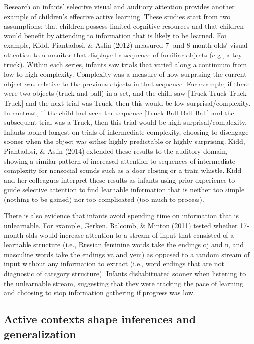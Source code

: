 \documentclass[oneside]{report}
\begin{document}
Research on infants' selective visual and auditory attention provides
another example of children's effective active learning. These studies
start from two assumptions: that children possess limited cognitive
resources and that children would benefit by attending to information
that is likely to be learned. For example, Kidd, Piantadosi, \& Aslin
(2012) measured 7- and 8-month-olds' visual attention to a monitor that
displayed a sequence of familiar objects (e.g., a toy truck). Within
each series, infants saw trials that varied along a continuum from low
to high complexity. Complexity was a measure of how surprising the
current object was relative to the previous objects in that sequence.
For example, if there were two objects (truck and ball) in a set, and
the child saw {[}Truck-Truck-Truck-Truck{]} and the next trial was
Truck, then this would be low surprisal/complexity. In contrast, if the
child had seen the sequence {[}Truck-Ball-Ball-Ball{]} and the
subsequent trial was a Truck, then this trial would be high
surprisal/complexity. Infants looked longest on trials of intermediate
complexity, choosing to disengage sooner when the object was either
highly predictable or highly surprising. Kidd, Piantadosi, \& Aslin
(2014) extended these results to the auditory domain, showing a similar
pattern of increased attention to sequences of intermediate complexity
for nonsocial sounds such as a door closing or a train whistle. Kidd and
her colleagues interpret these results as infants using prior experience
to guide selective attention to find learnable information that is
neither too simple (nothing to be gained) nor too complicated (too much
to process).

There is also evidence that infants avoid spending time on information
that is unlearnable. For example, Gerken, Balcomb, \& Minton (2011)
tested whether 17-month-olds would increase attention to a stream of
input that consisted of a learnable structure (i.e., Russian feminine
words take the endings oj and u, and masculine words take the endings ya
and yem) as opposed to a random stream of input without any information
to extract (i.e., word endings that are not diagnostic of category
structure). Infants dishabituated sooner when listening to the
unlearnable stream, suggesting that they were tracking the pace of
learning and choosing to stop information gathering if progress was low.

\hypertarget{active-contexts-shape-inferences-and-generalization}{%
\subsection{Active contexts shape inferences and
generalization}\label{active-contexts-shape-inferences-and-generalization}}
\end{document}
